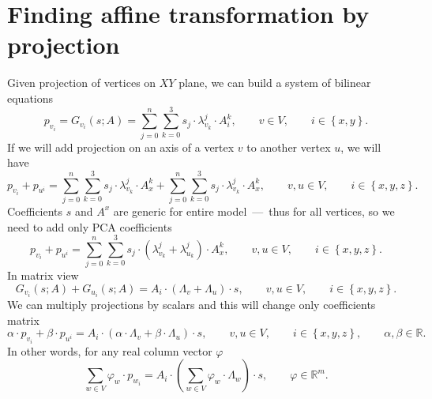 \section{Finding affine transformation by projection}

Given projection of vertices on $XY$ plane,
we can build a system of bilinear equations
\begin{equation*}
  p_{v_i}
  = G_{v_i}\left( s; A \right)
  = \sum\limits_{j = 0}^{n} \sum\limits_{k = 0}^{3}
    s_{j} \cdot \lambda^{j}_{v_k} \cdot A_i^{k},
  \qquad v \in V,
  \qquad i \in \left\{ x, y \right\}.
\end{equation*}
If we will add projection on an axis
of a vertex $v$ to another vertex $u$,
we  will have
\begin{equation*}
  p_{v_i} + p_{u^i}
  = \sum\limits_{j = 0}^{n} \sum\limits_{k = 0}^{3}
    s_{j} \cdot \lambda^{j}_{v_k} \cdot A_x^{k}
  + \sum\limits_{j = 0}^{n} \sum\limits_{k = 0}^{3}
    s_{j} \cdot \lambda^{j}_{v_k} \cdot A_x^{k},
  \qquad v, u \in V,
  \qquad i \in \left\{ x, y, z \right\}.
\end{equation*}
Coefficients $s$ and $A^x$ are generic
for entire model~---~thus for all vertices,
so we need to add only PCA coefficients
\begin{equation*}
  p_{v_i} + p_{u^i}
  = \sum\limits_{j = 0}^{n} \sum\limits_{k = 0}^{3}
    s_{j} \cdot \left( \lambda^{j}_{v_k} + \lambda^{j}_{u_k} \right)
    \cdot A_x^{k},
  \qquad v, u \in V,
  \qquad i \in \left\{ x, y, z \right\}.
\end{equation*}
In matrix view
\begin{equation*}
  G_{v_i}\left( s; A \right) + G_{u_i}\left( s; A \right)
  = A_i \cdot \left( \Lambda_v + \Lambda_u \right) \cdot s,
  \qquad v, u \in V,
  \qquad i \in \left\{ x, y, z \right\}.
\end{equation*}
We can multiply projections by scalars
and this will change only coefficients matrix
\begin{equation*}
  \alpha \cdot p_{v_i} + \beta \cdot p_{u^i}
  = A_i
    \cdot \left( \alpha \cdot \Lambda_v + \beta \cdot \Lambda_u \right)
    \cdot s,
  \qquad v, u \in V,
  \qquad i \in \left\{ x, y, z \right\},
  \qquad \alpha, \beta \in \mathbb{R}.
\end{equation*}
In other words, for any real column vector $\varphi$
\begin{equation*}
  \sum_{w \in V} \varphi_w \cdot p_{w_i}
  = A_i
    \cdot \left( \sum_{w \in V} \varphi_w \cdot \Lambda_w \right)
    \cdot s,
  \qquad \varphi \in \mathbb{R}^m.
\end{equation*}


